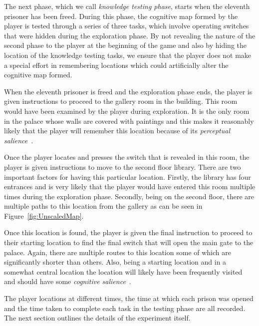 The next phase, which we call \emph{knowledge testing phase}, starts when the eleventh prisoner has been freed. During this phase, the cognitive map formed by the player is tested through a series of three tasks, which involve operating switches that were hidden during the exploration phase. By not revealing the nature of the second phase to the player at the beginning of the game and also by hiding the location of the knowledge testing tasks, we ensure that the player does not make a special effort in remembering locations which could artificially alter the cognitive map formed.

When the eleventh prisoner is freed and the exploration phase ends, the player is given instructions to proceed to the gallery room in the building. This room would have been examined by the player during exploration. It is the only room in the palace whose walls are covered with paintings and this makes it reasonably likely that the player will remember this location because of its \emph{perceptual salience}~\cite{Davis01122009}.


Once the player locates and presses the switch that is revealed in this room, the player is given instructions to move to the second floor library. There are two important factors for having this particular location. Firstly, the library has four entrances and is very likely that the player would have entered this room multiple times during the exploration phase. Secondly, being on the second floor, there are multiple paths to this location from the gallery as can be seen in Figure~\ref{fig:UnscaledMap}.

Once this location is found, the player is given the final instruction to proceed to their starting location to find the final switch that will open the main gate to the palace. Again, there are multiple routes to this location some of which are significantly shorter than others. Also, being a starting location and in a somewhat central location the location will likely have been frequently visited and should have some \emph{cognitive salience}~\cite{Davis01122009}.

The player locations at different times, the time at which each prison was opened and the time taken to complete each task in the testing phase are all recorded. The next section outlines the details of the experiment itself.


